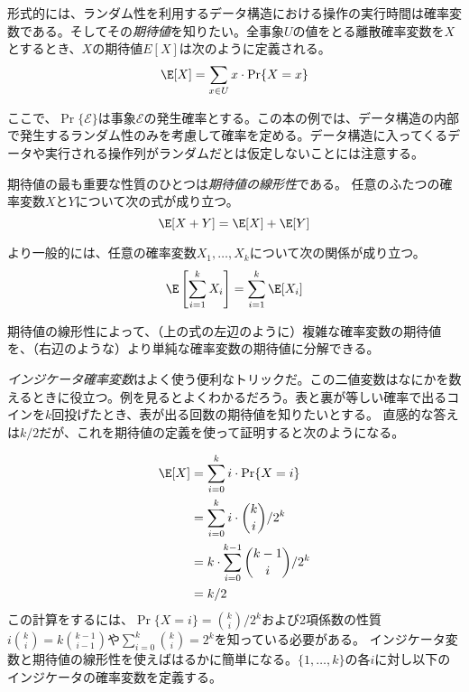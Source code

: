 形式的には、ランダム性を利用するデータ構造における操作の実行時間は確率変数である。そしてその\emph{期待値}を知りたい。全事象$U$の値をとる離散確率変数を$X$とするとき、$X$の期待値$E[X]$は次のように定義される。
%
\[
    \E[X] = \sum_{x\in U} x\cdot\Pr\{X=x\}
\]

ここで、$\Pr\{\mathcal{E}\}$は事象$\mathcal{E}$の発生確率とする。この本の例では、データ構造の内部で発生するランダム性のみを考慮して確率を定める。データ構造に入ってくるデータや実行される操作列がランダムだとは仮定しないことには注意する。

期待値の最も重要な性質のひとつは\emph{期待値の線形性}である。
%
任意のふたつの確率変数$X$と$Y$について次の式が成り立つ。
\[
   \E[X+Y] = \E[X] + \E[Y]
\]

より一般的には、任意の確率変数$ X_1,\ldots,X_k $について次の関係が成り立つ。
\[
   \E\left[\sum_{i=1}^k X_i\right] = \sum_{i=1}^k \E[X_i]
\]

期待値の線形性によって、（上の式の左辺のように）複雑な確率変数の期待値を、（右辺のような）より単純な確率変数の期待値に分解できる。

\emph{インジケータ確率変数}はよく使う便利なトリックだ。この二値変数はなにかを数えるときに役立つ。例を見るとよくわかるだろう。表と裏が等しい確率で出るコインを$k$回投げたとき、表が出る回数の期待値を知りたいとする。
直感的な答えは$k/2$だが、これを期待値の定義を使って証明すると次のようになる。

\begin{align*}
   \E[X] & = \sum_{i=0}^k i\cdot\Pr\{X=i\} \\
         & = \sum_{i=0}^k i\cdot\binom{k}{i}/2^k \\
         & = k\cdot \sum_{i=0}^{k-1}\binom{k-1}{i}/2^k \\
         & = k/2
\end{align*}
この計算をするには、$\Pr\{X=i\} = \binom{k}{i}/2^k$および2項係数の性質$i\binom{k}{i}=k\binom{k-1}{i-1}$や$\sum_{i=0}^{k} \binom{k}{i} = 2^{k}$を知っている必要がある。
インジケータ変数と期待値の線形性を使えばはるかに簡単になる。$\{1,\ldots,k\}$の各$i$に対し以下のインジケータの確率変数を定義する。

